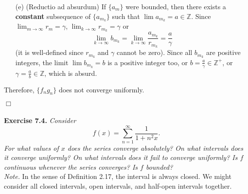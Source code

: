 \documentclass{article}
\begin{document}
\begin{enumerate}
\begin{enumerate}
    \item[(e)]
      (Reductio ad absurdum)
      If $\{a_m\}$ were bounded, then there exists
      a \textbf{constant} subsequence of $\{a_{m_k}\}$
      such that $\lim a_{m_k} = a \in \mathbb{Z}$.
      Since $\lim_{m \to \infty} r_m = \gamma$, $\lim_{k \to \infty} r_{m_k} = \gamma$ or
      \[
        \lim_{k \to \infty} b_{m_k}
        = \lim_{k \to \infty} \frac{a_{m_k}}{r_{m_k}}
        = \frac{a}{\gamma}
      \]
      (it is well-defined since $r_{m_k}$ and $\gamma$ cannot be zero).
      Since all $b_{m_k}$ are positive integers,
      the limit $\lim b_{m_k} = b$ is a positive integer too,
      or $b = \frac{a}{\gamma} \in \mathbb{Z}^+$, or $\gamma = \frac{a}{b} \in \mathbb{Z}$,
      which is absurd.
  \end{enumerate}
  Therefore, $\{f_n g_n\}$ does not converge uniformly.
\end{enumerate}
$\Box$ \\\\






\textbf{Exercise 7.4.}
\emph{Consider
\[
  f(x) = \sum_{n=1}^{\infty} \frac{1}{1+n^2x}.
\]
For what values of $x$ does the series converge absolutely?
On what intervals does it converge uniformly?
On what intervals does it fail to converge uniformly?
Is $f$ continuous whenever the series converges?
Is $f$ bounded?} \\

\emph{Note.}
In the sense of Definition 2.17, the interval is always closed.
We might consider all closed intervals, open intervals, and half-open intervals
together. \\
\end{document}

